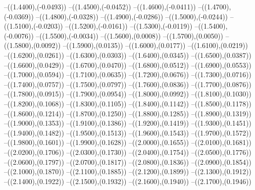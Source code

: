 {	--({\sx*(1.4400)},{\sy*(-0.0493)})
	--({\sx*(1.4500)},{\sy*(-0.0452)})
	--({\sx*(1.4600)},{\sy*(-0.0411)})
	--({\sx*(1.4700)},{\sy*(-0.0369)})
	--({\sx*(1.4800)},{\sy*(-0.0328)})
	--({\sx*(1.4900)},{\sy*(-0.0286)})
	--({\sx*(1.5000)},{\sy*(-0.0244)})
	--({\sx*(1.5100)},{\sy*(-0.0203)})
	--({\sx*(1.5200)},{\sy*(-0.0161)})
	--({\sx*(1.5300)},{\sy*(-0.0119)})
	--({\sx*(1.5400)},{\sy*(-0.0076)})
	--({\sx*(1.5500)},{\sy*(-0.0034)})
	--({\sx*(1.5600)},{\sy*(0.0008)})
	--({\sx*(1.5700)},{\sy*(0.0050)})
	--({\sx*(1.5800)},{\sy*(0.0092)})
	--({\sx*(1.5900)},{\sy*(0.0135)})
	--({\sx*(1.6000)},{\sy*(0.0177)})
	--({\sx*(1.6100)},{\sy*(0.0219)})
	--({\sx*(1.6200)},{\sy*(0.0261)})
	--({\sx*(1.6300)},{\sy*(0.0303)})
	--({\sx*(1.6400)},{\sy*(0.0345)})
	--({\sx*(1.6500)},{\sy*(0.0387)})
	--({\sx*(1.6600)},{\sy*(0.0429)})
	--({\sx*(1.6700)},{\sy*(0.0470)})
	--({\sx*(1.6800)},{\sy*(0.0512)})
	--({\sx*(1.6900)},{\sy*(0.0553)})
	--({\sx*(1.7000)},{\sy*(0.0594)})
	--({\sx*(1.7100)},{\sy*(0.0635)})
	--({\sx*(1.7200)},{\sy*(0.0676)})
	--({\sx*(1.7300)},{\sy*(0.0716)})
	--({\sx*(1.7400)},{\sy*(0.0757)})
	--({\sx*(1.7500)},{\sy*(0.0797)})
	--({\sx*(1.7600)},{\sy*(0.0836)})
	--({\sx*(1.7700)},{\sy*(0.0876)})
	--({\sx*(1.7800)},{\sy*(0.0915)})
	--({\sx*(1.7900)},{\sy*(0.0954)})
	--({\sx*(1.8000)},{\sy*(0.0992)})
	--({\sx*(1.8100)},{\sy*(0.1030)})
	--({\sx*(1.8200)},{\sy*(0.1068)})
	--({\sx*(1.8300)},{\sy*(0.1105)})
	--({\sx*(1.8400)},{\sy*(0.1142)})
	--({\sx*(1.8500)},{\sy*(0.1178)})
	--({\sx*(1.8600)},{\sy*(0.1214)})
	--({\sx*(1.8700)},{\sy*(0.1250)})
	--({\sx*(1.8800)},{\sy*(0.1285)})
	--({\sx*(1.8900)},{\sy*(0.1319)})
	--({\sx*(1.9000)},{\sy*(0.1353)})
	--({\sx*(1.9100)},{\sy*(0.1386)})
	--({\sx*(1.9200)},{\sy*(0.1419)})
	--({\sx*(1.9300)},{\sy*(0.1451)})
	--({\sx*(1.9400)},{\sy*(0.1482)})
	--({\sx*(1.9500)},{\sy*(0.1513)})
	--({\sx*(1.9600)},{\sy*(0.1543)})
	--({\sx*(1.9700)},{\sy*(0.1572)})
	--({\sx*(1.9800)},{\sy*(0.1601)})
	--({\sx*(1.9900)},{\sy*(0.1628)})
	--({\sx*(2.0000)},{\sy*(0.1655)})
	--({\sx*(2.0100)},{\sy*(0.1681)})
	--({\sx*(2.0200)},{\sy*(0.1706)})
	--({\sx*(2.0300)},{\sy*(0.1730)})
	--({\sx*(2.0400)},{\sy*(0.1754)})
	--({\sx*(2.0500)},{\sy*(0.1776)})
	--({\sx*(2.0600)},{\sy*(0.1797)})
	--({\sx*(2.0700)},{\sy*(0.1817)})
	--({\sx*(2.0800)},{\sy*(0.1836)})
	--({\sx*(2.0900)},{\sy*(0.1854)})
	--({\sx*(2.1000)},{\sy*(0.1870)})
	--({\sx*(2.1100)},{\sy*(0.1885)})
	--({\sx*(2.1200)},{\sy*(0.1899)})
	--({\sx*(2.1300)},{\sy*(0.1912)})
	--({\sx*(2.1400)},{\sy*(0.1922)})
	--({\sx*(2.1500)},{\sy*(0.1932)})
	--({\sx*(2.1600)},{\sy*(0.1940)})
	--({\sx*(2.1700)},{\sy*(0.1946)})
}
